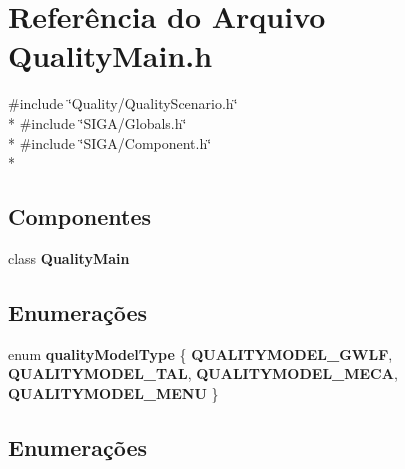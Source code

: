 \section{Referência do Arquivo Quality\+Main.\+h}
\label{_quality_main_8h}
{\ttfamily \#include \char`\"{}Quality/\+Quality\+Scenario.\+h\char`\"{}}\\*
{\ttfamily \#include \char`\"{}S\+I\+G\+A/\+Globals.\+h\char`\"{}}\\*
{\ttfamily \#include \char`\"{}S\+I\+G\+A/\+Component.\+h\char`\"{}}\\*
\subsection*{Componentes}
\begin{DoxyCompactItemize}
\item 
class {\bf Quality\+Main}
\end{DoxyCompactItemize}
\subsection*{Enumerações}
\begin{DoxyCompactItemize}
\item 
enum {\bf quality\+Model\+Type} \{ {\bf Q\+U\+A\+L\+I\+T\+Y\+M\+O\+D\+E\+L\+\_\+\+G\+W\+LF}, 
{\bf Q\+U\+A\+L\+I\+T\+Y\+M\+O\+D\+E\+L\+\_\+\+T\+AL}, 
{\bf Q\+U\+A\+L\+I\+T\+Y\+M\+O\+D\+E\+L\+\_\+\+M\+E\+CA}, 
{\bf Q\+U\+A\+L\+I\+T\+Y\+M\+O\+D\+E\+L\+\_\+\+M\+E\+NU}
 \}
\end{DoxyCompactItemize}


\subsection{Enumerações}
